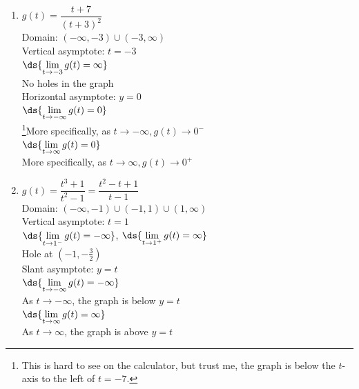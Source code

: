 \documentclass{ximera}
\begin{document}
\begin{multicols}{2}
\begin{enumerate}
\setcounter{enumi}{\value{HW}}

\item $g(t) = \dfrac{t + 7}{(t + 3)^{2}}$ \\
Domain: $(-\infty, -3) \cup (-3, \infty)$\\
Vertical asymptote: $t = -3$\\
$\ds{\lim_{t \rightarrow -3} g(t) =  \infty}$ \\
No holes in the graph\\
Horizontal asymptote: $y = 0$ \\
$\ds{\lim_{t \rightarrow - \infty} g(t) = 0}$\\
\footnote{This is hard to see on the calculator, but trust me, the graph is below the $t$-axis to the left of $t = -7$.}More specifically, as $t \rightarrow -\infty, g(t) \rightarrow 0^{-}$\\
$\ds{\lim_{t \rightarrow \infty} g(t) = 0}$\\
More specifically, as $t \rightarrow \infty, g(t) \rightarrow 0^{+}$\\

\vfill

\columnbreak

\item $g(t) = \dfrac{t^{3} + 1}{t^{2} - 1} = \dfrac{t^{2} - t+ 1}{t-1}$\\
Domain: $(-\infty, -1) \cup (-1, 1) \cup (1, \infty)$\\
Vertical asymptote: $t = 1$\\
$\ds{\lim_{t \rightarrow 1^{-}} g(t) =  -\infty}$, $\ds{\lim_{t \rightarrow 1^{+}} g(t) =  \infty}$ \\
Hole at $(-1, -\frac{3}{2})$\\
Slant asymptote: $y=t$  \\
$\ds{\lim_{t \rightarrow -\infty} g(t) = -\infty}$\\
As $t \rightarrow -\infty$, the graph is below $y=t$\\
$\ds{\lim_{t \rightarrow \infty} g(t) = \infty}$\\
As $t \rightarrow \infty$, the graph is above $y=t$\\

\setcounter{HW}{\value{enumi}}
\end{enumerate}
\end{multicols}
\end{document}
